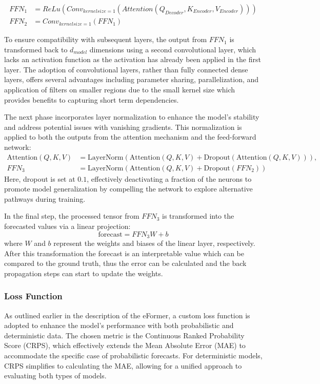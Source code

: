 \documentclass{article}
\begin{document}
\begin{align}\label{eq: decoder-ffn}
    FFN_1 &= ReLu(Conv_{kernelsize = 1}(Attention(Q_{Decoder}, K_{Encoder}, V_{Encoder}))) \\
    FFN_2 &= Conv_{kernelsize = 1}(FFN_1)
\end{align}

To ensure compatibility with subsequent layers, the output from $FFN_1$ is transformed back to $d_{model}$ dimensions using a second convolutional layer, which lacks an activation function as the activation has already been applied in the first layer. The adoption of convolutional layers, rather than fully connected dense layers, offers several advantages including parameter sharing, parallelization, and application of filters on smaller regions due to the small kernel size which provides benefits to capturing short term dependencies.

The next phase incorporates layer normalization to enhance the model's stability and address potential issues with vanishing gradients. This normalization is applied to both the outputs from the attention mechanism and the feed-forward network:
\begin{align}
    \text{Attention}(Q,K,V) &= \text{LayerNorm}(\text{Attention}(Q,K,V) + \text{Dropout}(\text{Attention}(Q,K,V))), \\
    FFN_3 &= \text{LayerNorm}(\text{Attention}(Q,K,V) + \text{Dropout}(FFN_2))
\end{align}
Here, dropout is set at $0.1$, effectively deactivating a fraction of the neurons to promote model generalization by compelling the network to explore alternative pathways during training.

In the final step, the processed tensor from $FFN_3$ is transformed into the forecasted values via a linear projection:
\begin{equation}
    \text{forecast} = FFN_3 W + b
\end{equation}
where $W$ and $b$ represent the weights and biases of the linear layer, respectively. After this transformation the forecast is an interpretable value which can be compared to the ground truth, thus the error can be calculated and the back propagation steps can start to update the weights.


\subsubsection{Loss Function}

As outlined earlier in the description of the eFormer, a custom loss function is adopted to enhance the model's performance with both probabilistic and deterministic data. The chosen metric is the Continuous Ranked Probability Score (CRPS), which effectively extends the Mean Absolute Error (MAE) to accommodate the specific case of probabilistic forecasts. For deterministic models, CRPS simplifies to calculating the MAE, allowing for a unified approach to evaluating both types of models.
\end{document}
